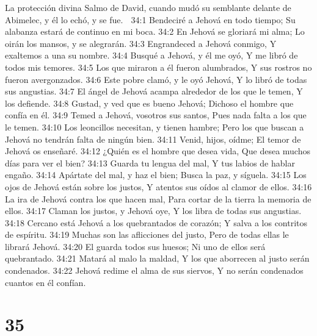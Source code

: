 La protección divina 
Salmo de David, cuando mudó su semblante delante de Abimelec,  y él lo echó, y se fue. 

34:1 Bendeciré a Jehová en todo tiempo; 
Su alabanza estará de continuo en mi boca. 
34:2 En Jehová se gloriará mi alma; 
Lo oirán los mansos, y se alegrarán. 
34:3 Engrandeced a Jehová conmigo, 
Y exaltemos a una su nombre. 
34:4 Busqué a Jehová, y él me oyó, 
Y me libró de todos mis temores. 
34:5 Los que miraron a él fueron alumbrados, 
Y sus rostros no fueron avergonzados. 
34:6 Este pobre clamó, y le oyó Jehová, 
Y lo libró de todas sus angustias. 
34:7 El ángel de Jehová acampa alrededor de los que le temen, 
Y los defiende. 
34:8 Gustad, y ved que es bueno Jehová; 
Dichoso el hombre que confía en él. 
34:9 Temed a Jehová, vosotros sus santos, 
Pues nada falta a los que le temen. 
34:10 Los leoncillos necesitan, y tienen hambre; 
Pero los que buscan a Jehová no tendrán falta de ningún bien. 
34:11 Venid, hijos, oídme; 
El temor de Jehová os enseñaré. 
34:12 ¿Quién es el hombre que desea vida, 
Que desea muchos días para ver el bien? 
34:13 Guarda tu lengua del mal, 
Y tus labios de hablar engaño. 
34:14 Apártate del mal, y haz el bien; 
Busca la paz, y síguela. 
34:15 Los ojos de Jehová están sobre los justos, 
Y atentos sus oídos al clamor de ellos. 
34:16 La ira de Jehová contra los que hacen mal, 
Para cortar de la tierra la memoria de ellos. 
34:17 Claman los justos, y Jehová oye, 
Y los libra de todas sus angustias. 
34:18 Cercano está Jehová a los quebrantados de corazón; 
Y salva a los contritos de espíritu. 
34:19 Muchas son las aflicciones del justo, 
Pero de todas ellas le librará Jehová. 
34:20 El guarda todos sus huesos; 
Ni uno de ellos será quebrantado. 
34:21 Matará al malo la maldad, 
Y los que aborrecen al justo serán condenados. 
34:22 Jehová redime el alma de sus siervos, 
Y no serán condenados cuantos en él confían. 

\chapter{35}

